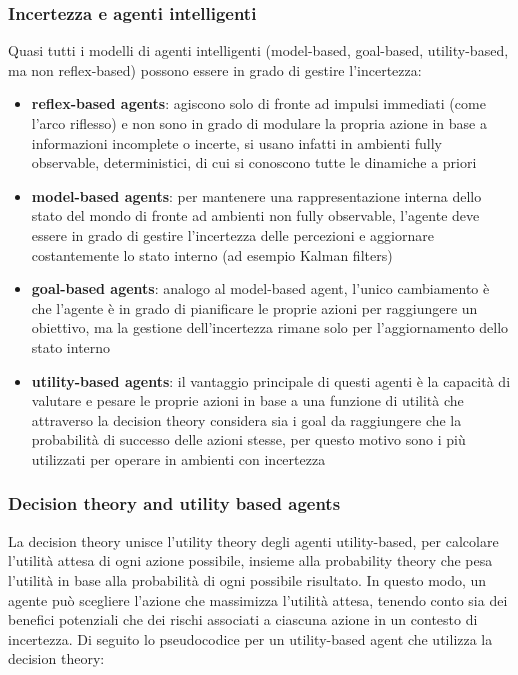 \subsubsection*{Incertezza e agenti intelligenti}
Quasi tutti i modelli di agenti intelligenti (model-based, goal-based, utility-based, ma non reflex-based) possono essere
in grado di gestire l'incertezza:
\begin{itemize}
	\item \textbf{reflex-based agents}: agiscono solo di fronte ad impulsi immediati (come l'arco riflesso) e non sono in
	grado di modulare la propria azione in base a informazioni incomplete o incerte, si usano infatti in ambienti fully
	observable, deterministici, di cui si conoscono tutte le dinamiche a priori
	\item \textbf{model-based agents}: per mantenere una rappresentazione interna dello stato del mondo di fronte ad ambienti
	non fully observable, l'agente deve essere in grado di gestire l'incertezza delle percezioni e aggiornare costantemente
	lo stato interno (ad esempio Kalman filters)
	\item \textbf{goal-based agents}: analogo al model-based agent, l'unico cambiamento è che l'agente è in grado
	di pianificare le proprie azioni per raggiungere un obiettivo, ma la gestione dell'incertezza rimane solo per
	l'aggiornamento dello stato interno
	\item \textbf{utility-based agents}: il vantaggio principale di questi agenti è la capacità di valutare e pesare
	le proprie azioni in base a una funzione di utilità che attraverso la decision theory considera sia i goal da
	raggiungere che la probabilità di successo delle azioni stesse, per questo motivo sono i più utilizzati per operare
	in ambienti con incertezza
\end{itemize}

\subsubsection*{Decision theory and utility based agents}
La decision theory unisce l'utility theory degli agenti utility-based, per calcolare l'utilità attesa di ogni azione possibile,
insieme alla probability theory che pesa l'utilità in base alla probabilità di ogni possibile risultato. In questo modo,
un agente può scegliere l'azione che massimizza l'utilità attesa, tenendo conto sia dei benefici potenziali che dei rischi
associati a ciascuna azione in un contesto di incertezza. Di seguito lo pseudocodice per un utility-based agent che utilizza
la decision theory:

